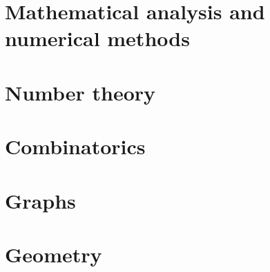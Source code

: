 \section*{Mathematical analysis and numerical methods}
	

\section*{Number theory}
	

\section*{Combinatorics}
	

\section*{Graphs}
	
	
	


\section*{Geometry}
	
